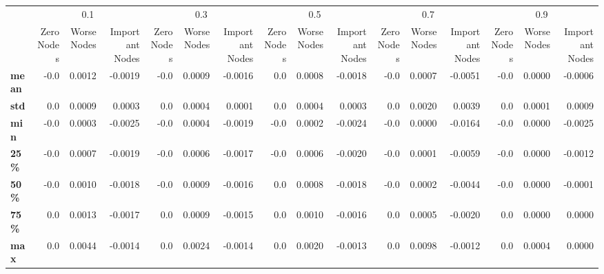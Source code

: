 \begin{tabular}{lrrrrrrrrrrrrrrr}
\toprule
{} & \multicolumn{3}{c}{0.1} & \multicolumn{3}{c}{0.3} & \multicolumn{3}{c}{0.5} & \multicolumn{3}{c}{0.7} & \multicolumn{3}{c}{0.9} \\
{} & Zero Nodes & Worse Nodes & Important Nodes & Zero Nodes & Worse Nodes & Important Nodes & Zero Nodes & Worse Nodes & Important Nodes & Zero Nodes & Worse Nodes & Important Nodes & Zero Nodes & Worse Nodes & Important Nodes \\
\midrule
\textbf{mean} &       -0.0 &      0.0012 &         -0.0019 &       -0.0 &      0.0009 &         -0.0016 &        0.0 &      0.0008 &         -0.0018 &       -0.0 &      0.0007 &         -0.0051 &       -0.0 &      0.0000 &         -0.0006 \\
\textbf{std } &        0.0 &      0.0009 &          0.0003 &        0.0 &      0.0004 &          0.0001 &        0.0 &      0.0004 &          0.0003 &        0.0 &      0.0020 &          0.0039 &        0.0 &      0.0001 &          0.0009 \\
\textbf{min } &       -0.0 &      0.0003 &         -0.0025 &       -0.0 &      0.0004 &         -0.0019 &       -0.0 &      0.0002 &         -0.0024 &       -0.0 &      0.0000 &         -0.0164 &       -0.0 &      0.0000 &         -0.0025 \\
\textbf{25\% } &       -0.0 &      0.0007 &         -0.0019 &       -0.0 &      0.0006 &         -0.0017 &       -0.0 &      0.0006 &         -0.0020 &       -0.0 &      0.0001 &         -0.0059 &       -0.0 &      0.0000 &         -0.0012 \\
\textbf{50\% } &       -0.0 &      0.0010 &         -0.0018 &       -0.0 &      0.0009 &         -0.0016 &        0.0 &      0.0008 &         -0.0018 &       -0.0 &      0.0002 &         -0.0044 &       -0.0 &      0.0000 &         -0.0001 \\
\textbf{75\% } &        0.0 &      0.0013 &         -0.0017 &        0.0 &      0.0009 &         -0.0015 &        0.0 &      0.0010 &         -0.0016 &        0.0 &      0.0005 &         -0.0020 &        0.0 &      0.0000 &          0.0000 \\
\textbf{max } &        0.0 &      0.0044 &         -0.0014 &        0.0 &      0.0024 &         -0.0014 &        0.0 &      0.0020 &         -0.0013 &        0.0 &      0.0098 &         -0.0012 &        0.0 &      0.0004 &          0.0000 \\
\bottomrule
\end{tabular}
